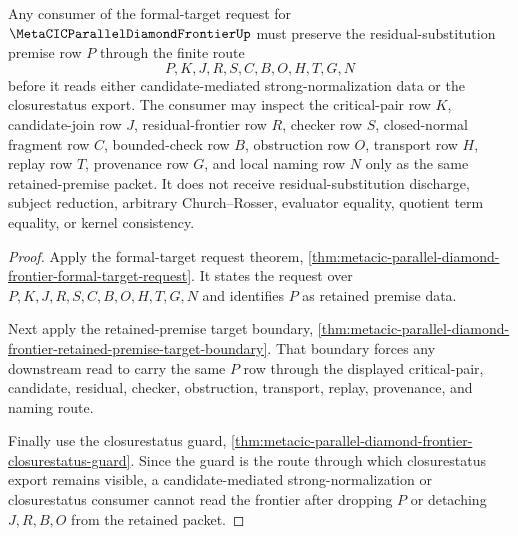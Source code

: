 \begin{theorem}
\label{thm:metacic-parallel-diamond-frontier-formal-target-consumer-retention}
Any consumer of the formal-target request for $\MetaCICParallelDiamondFrontierUp$ must preserve the residual-substitution premise row $P$ through the finite route
$$
P,K,J,R,S,C,B,O,H,T,G,N
$$
before it reads either candidate-mediated strong-normalization data or the closurestatus export. The consumer may inspect the critical-pair row $K$, candidate-join row $J$, residual-frontier row $R$, checker row $S$, closed-normal fragment row $C$, bounded-check row $B$, obstruction row $O$, transport row $H$, replay row $T$, provenance row $G$, and local naming row $N$ only as the same retained-premise packet. It does not receive residual-substitution discharge, subject reduction, arbitrary Church--Rosser, evaluator equality, quotient term equality, or kernel consistency.
\end{theorem}
\begin{proof}
Apply the formal-target request theorem, \autoref{thm:metacic-parallel-diamond-frontier-formal-target-request}. It states the request over $P,K,J,R,S,C,B,O,H,T,G,N$ and identifies $P$ as retained premise data.

Next apply the retained-premise target boundary, \autoref{thm:metacic-parallel-diamond-frontier-retained-premise-target-boundary}. That boundary forces any downstream read to carry the same $P$ row through the displayed critical-pair, candidate, residual, checker, obstruction, transport, replay, provenance, and naming route.

Finally use the closurestatus guard, \autoref{thm:metacic-parallel-diamond-frontier-closurestatus-guard}. Since the guard is the route through which closurestatus export remains visible, a candidate-mediated strong-normalization or closurestatus consumer cannot read the frontier after dropping $P$ or detaching $J,R,B,O$ from the retained packet.
\end{proof}
